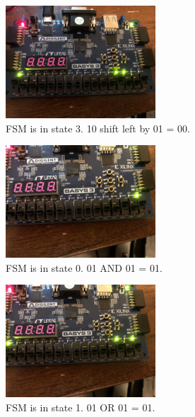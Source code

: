 \documentclass[11pt]{article}
\begin{document}
\begin{figure}[H]
\begin{center}
	\includegraphics[width=0.5\textwidth]{./images/p3/IMG_0945.jpg}
	\caption{\label{fig:int_res4}FSM is in state 3. 10 shift left by 01 = 00.}
\end{center}
\end{figure}

\begin{figure}[H]
\begin{center}
	\includegraphics[width=0.5\textwidth]{./images/p3/IMG_3247.jpg}
	\caption{\label{fig:int_res5}FSM is in state 0. 01 AND 01 = 01.}
\end{center}
\end{figure}

\begin{figure}[H]
\begin{center}
	\includegraphics[width=0.5\textwidth]{./images/p3/IMG_0490.jpg}
	\caption{\label{fig:int_res6}FSM is in state 1. 01 OR 01 = 01.}
\end{center}
\end{figure}
\end{document}

